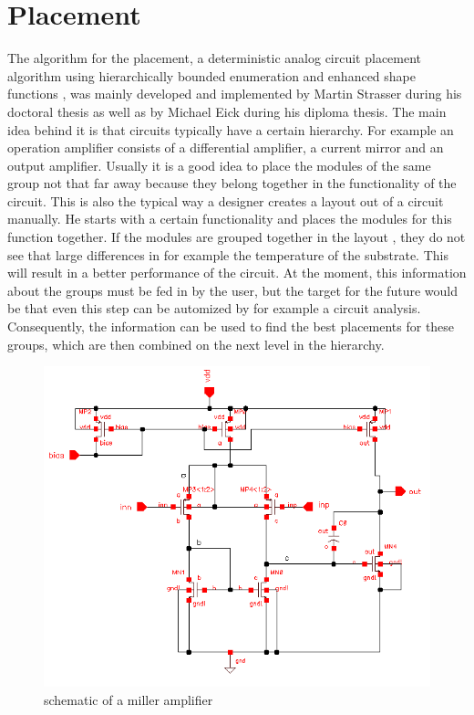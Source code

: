 \chapter{Placement}
The algorithm for the placement, a deterministic analog circuit placement algorithm using hierarchically bounded enumeration and enhanced shape functions \cite{iccad:plantage}, was mainly developed and implemented by Martin Strasser during his doctoral thesis as well as by Michael Eick during his diploma thesis. The main idea behind it is that circuits typically have a certain hierarchy. For example an operation amplifier  consists of a differential amplifier, a current mirror and an output amplifier. Usually it is a good idea to place the modules of the same group not that far away because they belong together in the functionality of the circuit. This is also the typical way a designer creates a layout out of a circuit manually. He starts with a certain functionality and places the modules for this function together. If the modules are grouped together in the layout , they do not see that large differences in for example the temperature of the substrate. This will result in a better performance of the circuit.
At the moment, this information about the groups must be fed in by the user, but the target for the future would be that even this step can be automized by for example a circuit analysis. Consequently, the information can be used to find the best placements for these groups, which are then combined on the next level in the hierarchy.

\begin{figure}
	\centering
	\includegraphics[scale=0.6]{FIG/miller_amplifier_schematic.png}
	\caption{schematic of a miller amplifier}
	\label{fig:miller_amplifier_schematic}
\end{figure}

